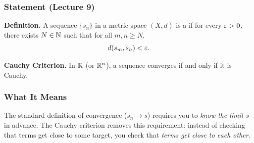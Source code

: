 \documentclass[../master/master.tex]{subfiles}
\begin{document}
\subsubsection*{Statement (Lecture 9)}

\textbf{Definition.} A sequence $\{s_n\}$ in a metric space $(X, d)$ is a  if for every $\varepsilon > 0$, there exists $N \in \mathbb{N}$ such that for all $m, n \geq N$,
\[
d(s_m, s_n) < \varepsilon.
\]

\textbf{Cauchy Criterion.} In $\mathbb{R}$ (or $\mathbb{R}^n$), a sequence converges if and only if it is Cauchy.

\subsubsection*{What It Means}

The standard definition of convergence ($s_n \to s$) requires you to \emph{know the limit $s$} in advance. The Cauchy criterion removes this requirement: instead of checking that terms get close to some target, you check that \emph{terms get close to each other}.
\end{document}
